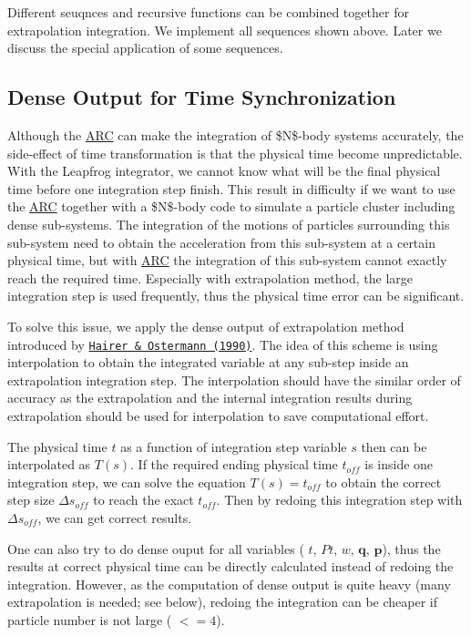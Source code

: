 Different seuqnces and recursive functions can be combined together for extrapolation integration. We implement all sequences shown above. Later we discuss the special application of some sequences.\hypertarget{index_dense_sec}{}\subsection{Dense Output for Time Synchronization}\label{index_dense_sec}
Although the \hyperlink{namespaceARC}{A\+RC} can make the integration of \$N\$-\/body systems accurately, the side-\/effect of time transformation is that the physical time become unpredictable. With the Leapfrog integrator, we cannot know what will be the final physical time before one integration step finish. This result in difficulty if we want to use the \hyperlink{namespaceARC}{A\+RC} together with a \$N\$-\/body code to simulate a particle cluster including dense sub-\/systems. The integration of the motions of particles surrounding this sub-\/system need to obtain the acceleration from this sub-\/system at a certain physical time, but with \hyperlink{namespaceARC}{A\+RC} the integration of this sub-\/system cannot exactly reach the required time. Especially with extrapolation method, the large integration step is used frequently, thus the physical time error can be significant.

To solve this issue, we apply the dense output of extrapolation method introduced by \href{http://link.springer.com/article/10.1007%2FBF01385634}{\tt Hairer \& Ostermann (1990)}. The idea of this scheme is using interpolation to obtain the integrated variable at any sub-\/step inside an extrapolation integration step. The interpolation should have the similar order of accuracy as the extrapolation and the internal integration results during extrapolation should be used for interpolation to save computational effort.

The physical time $ t$ as a function of integration step variable $ s $ then can be interpolated as $ T(s) $. If the required ending physical time $ t_{off} $ is inside one integration step, we can solve the equation $ T(s)=t_{off} $ to obtain the correct step size $\Delta s_{off} $ to reach the exact $ t_{off} $. Then by redoing this integration step with $\Delta s_{off}$, we can get correct results.

One can also try to do dense ouput for all variables ( $t$, $Pt$, $w$, $\mathbf{q}$, $\mathbf{p}$), thus the results at correct physical time can be directly calculated instead of redoing the integration. However, as the computation of dense output is quite heavy (many extrapolation is needed; see below), redoing the integration can be cheaper if particle number is not large ( $<=4$).

